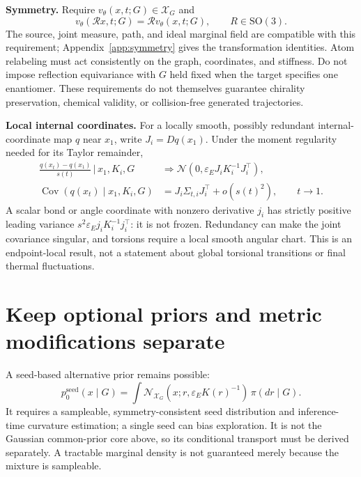 \documentclass[11pt,letterpaper]{article}
\newcommand{\X}{\mathcal X_G}
\newcommand{\epsE}{\varepsilon_E}
\newcommand{\SO}{\mathrm{SO}(3)}
\newcommand{\Cov}{\operatorname{Cov}}
\newcommand{\given}{\,\big|\,}
\begin{document}
\textbf{Symmetry.} Require $v_\theta(x,t;G)\in\X$ and
\begin{equation}\label{eq:equivariance}
v_\theta(\mathcal R x,t;G)=\mathcal R v_\theta(x,t;G),\qquad R\in\SO.
\end{equation}
The source, joint measure, path, and ideal marginal field are compatible with this requirement; Appendix~\ref{app:symmetry} gives the transformation identities. Atom relabeling must act consistently on the graph, coordinates, and stiffness. Do not impose reflection equivariance with $G$ held fixed when the target specifies one enantiomer. These requirements do not themselves guarantee chirality preservation, chemical validity, or collision-free generated trajectories.

\textbf{Local internal coordinates.} For a locally smooth, possibly redundant internal-coordinate map $q$ near $x_1$, write $J_i=Dq(x_1)$. Under the moment regularity needed for its Taylor remainder,
\begin{equation}\label{eq:internal}
\begin{aligned}
\frac{q(x_t)-q(x_1)}{s(t)}\given x_1,K_i,G
&\Rightarrow\mathcal N\!\left(0,\epsE J_iK_i^{-1}J_i^\top\right),\\
\Cov(q(x_t)\mid x_1,K_i,G)
&=J_i\Sigma_{t,i}J_i^\top+o(s(t)^2),\qquad t\to1.
\end{aligned}
\end{equation}
A scalar bond or angle coordinate with nonzero derivative $j_i$ has strictly positive leading variance $s^2\epsE j_iK_i^{-1}j_i^\top$: it is not frozen. Redundancy can make the joint covariance singular, and torsions require a local smooth angular chart. This is an endpoint-local result, not a statement about global torsional transitions or final thermal fluctuations.

\section{Keep optional priors and metric modifications separate}

A seed-based alternative prior remains possible:
\begin{equation}\label{eq:seed}
p_0^{\mathrm{seed}}(x\mid G)=
\int \mathcal N_{\X}(x;r,\epsE K(r)^{-1})\,\pi(dr\mid G).
\end{equation}
It requires a sampleable, symmetry-consistent seed distribution and inference-time curvature estimation; a single seed can bias exploration. It is not the Gaussian common-prior core above, so its conditional transport must be derived separately. A tractable marginal density is not guaranteed merely because the mixture is sampleable.
\end{document}
